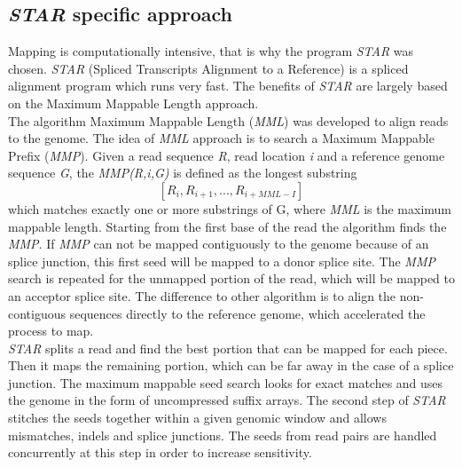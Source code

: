 \documentclass[12pt, a4paper]{report}
\begin{document}
\subsection{\textit{STAR} specific approach}
Mapping is computationally intensive, that is why the program \textit{STAR} was chosen. \textit{STAR} (Spliced Transcripts Alignment to a Reference) is a spliced alignment program which runs very fast. The benefits of \textit{STAR} are largely based on the Maximum Mappable Length approach. \\
The algorithm Maximum Mappable Length (\textit{MML}) was developed to align reads to the genome. The idea of \textit{MML} approach is to search a Maximum Mappable Prefix (\textit{MMP}). Given a read sequence \textit{R}, read location \textit{i} and a reference genome sequence \textit{G}, the \textit{MMP(R,i,G)} is defined as the longest substring  
\[
[R_{i} , R_{i+1} , ... , R_{i+MML-I} ]
\]
which matches exactly one or more substrings of G, where \textit{MML} is the maximum mappable length. 
Starting from the first base of the read the algorithm finds the \textit{MMP}. If \textit{MMP} can not be mapped contiguously to the genome because of an splice junction, this first seed will be mapped to a donor splice site. The \textit{MMP} search is repeated for the unmapped portion of the read, which will be mapped to an acceptor splice site.
The difference to other algorithm is to align the non-contiguous sequences directly to the reference genome, which accelerated the process to map. \cite{Dobin2013}\\
\textit{STAR} splits a read and find the best portion that can be mapped for each piece. Then it maps the remaining portion, which can be far away in the case of a splice junction. The maximum mappable seed search looks for exact matches and uses the genome in the form of uncompressed suffix arrays. The second step of \textit{STAR} stitches the seeds together within a given genomic window and allows mismatches, indels and splice junctions. The seeds from read pairs are handled concurrently at this step in order to increase sensitivity. \cite{Dobin2013, Korpelainen2014}
\end{document}
